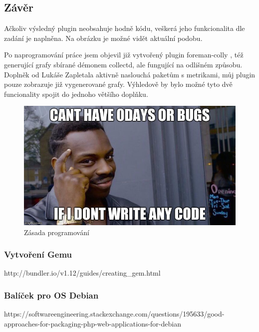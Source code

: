 \documentclass[thesis=B,czech]{FITthesis}[2012/06/26]
\begin{document}
\subsection{Závěr}

Ačkoliv výsledný plugin neobsahuje hodně kódu, veškerá jeho funkcionalita dle zadání je naplněna. Na obrázku je možné vidět aktuální podobu. 

Po naprogramování práce jsem objevil již vytvořený plugin foreman-colly \cite{foreman-colly}, též generující grafy sbírané démonem collectd, ale fungující na odlišném způsobu. Doplněk od Lukáše Zapletala aktivně naslouchá paketům s metrikami, můj plugin pouze zobrazuje již vygenerované grafy. Výhledově by bylo možné tyto dvě funcionality spojit do jednoho většího doplňku.


\begin{figure}[h]\centering
\includegraphics[width=1\textwidth]{files/truthiestmeme.jpg}
	\caption{Zásada programování}\label{fig:float}
\end{figure}




\subsubsection{Vytvoření Gemu}

http://bundler.io/v1.12/guides/creating_gem.html


\subsubsection{Balíček pro OS Debian}

https://softwareengineering.stackexchange.com/questions/195633/good-approaches-for-packaging-php-web-applications-for-debian
\end{document}
